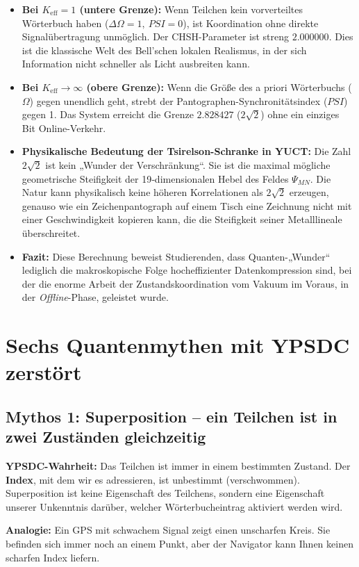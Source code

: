\documentclass[12pt,a4paper]{article}
\begin{document}
	\begin{itemize}
		\item \textbf{Bei \(K_{\mathrm{eff}} = 1\) (untere Grenze):}  
		Wenn Teilchen kein vorverteiltes Wörterbuch haben (\(\Delta\Omega = 1,\ PSI = 0\)), ist Koordination ohne direkte Signalübertragung unmöglich. Der CHSH-Parameter ist streng \(2.000000\). Dies ist die klassische Welt des Bell’schen lokalen Realismus, in der sich Information nicht schneller als Licht ausbreiten kann.
		
		\item \textbf{Bei \(K_{\mathrm{eff}} \to \infty\) (obere Grenze):}  
		Wenn die Größe des a priori Wörterbuchs (\(\Omega\)) gegen unendlich geht, strebt der Pantographen-Synchronitätsindex (\(PSI\)) gegen 1. Das System erreicht die Grenze \(2.828427\) (\(2\sqrt{2}\)) ohne ein einziges Bit Online-Verkehr.
		
		\item \textbf{Physikalische Bedeutung der Tsirelson-Schranke in YUCT:}  
		Die Zahl \(2\sqrt{2}\) ist kein „Wunder der Verschränkung“. Sie ist die maximal mögliche geometrische Steifigkeit der 19‑dimensionalen Hebel des Feldes \(\Psi_{MN}\). Die Natur kann physikalisch keine höheren Korrelationen als \(2\sqrt{2}\) erzeugen, genauso wie ein Zeichenpantograph auf einem Tisch eine Zeichnung nicht mit einer Geschwindigkeit kopieren kann, die die Steifigkeit seiner Metalllineale überschreitet.
		
		\item \textbf{Fazit:}  
		Diese Berechnung beweist Studierenden, dass Quanten-„Wunder“ lediglich die makroskopische Folge hocheffizienter Datenkompression sind, bei der die enorme Arbeit der Zustandskoordination vom Vakuum im Voraus, in der \textit{Offline}-Phase, geleistet wurde.
	\end{itemize}
	
	
	\section{Sechs Quantenmythen mit YPSDC zerstört}
	
	\subsection{Mythos 1: Superposition – ein Teilchen ist in zwei Zuständen gleichzeitig}
	\textbf{YPSDC-Wahrheit:} Das Teilchen ist immer in einem bestimmten Zustand. Der \textbf{Index}, mit dem wir es adressieren, ist unbestimmt (verschwommen). Superposition ist keine Eigenschaft des Teilchens, sondern eine Eigenschaft unserer Unkenntnis darüber, welcher Wörterbucheintrag aktiviert werden wird.
	\par
	\textbf{Analogie:} Ein GPS mit schwachem Signal zeigt einen unscharfen Kreis. Sie befinden sich immer noch an einem Punkt, aber der Navigator kann Ihnen keinen scharfen Index liefern.
	
\end{document}
